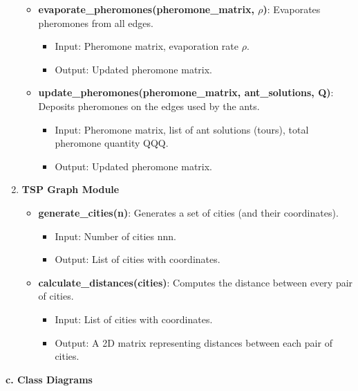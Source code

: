 \documentclass[
]{article}
\begin{document}
\begin{enumerate}
  \begin{itemize}
  \item
    \textbf{evaporate\_pheromones(pheromone\_matrix, $\rho$)}: Evaporates
    pheromones from all edges.

    \begin{itemize}
    \item
      Input: Pheromone matrix, evaporation rate $\rho$.
    \item
      Output: Updated pheromone matrix.
    \end{itemize}
  \item
    \textbf{update\_pheromones(pheromone\_matrix, ant\_solutions, Q)}:
    Deposits pheromones on the edges used by the ants.

    \begin{itemize}
    \item
      Input: Pheromone matrix, list of ant solutions (tours), total
      pheromone quantity QQQ.
    \item
      Output: Updated pheromone matrix.
    \end{itemize}
  \end{itemize}
\item
  \textbf{TSP Graph Module}

  \begin{itemize}
  \item
    \textbf{generate\_cities(n)}: Generates a set of cities (and their
    coordinates).

    \begin{itemize}
    \item
      Input: Number of cities nnn.
    \item
      Output: List of cities with coordinates.
    \end{itemize}
  \item
    \textbf{calculate\_distances(cities)}: Computes the distance between
    every pair of cities.

    \begin{itemize}
    \item
      Input: List of cities with coordinates.
    \item
      Output: A 2D matrix representing distances between each pair of
      cities.
    \end{itemize}
  \end{itemize}
\end{enumerate}

\textbf{c. Class Diagrams}
\end{document}
